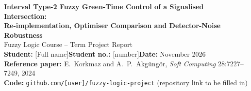 \documentclass[10pt,a4paper]{article}
\begin{document}
\begin{center}
{\LARGE\bfseries Interval Type-2 Fuzzy Green-Time Control of a Signalised Intersection:\\[2pt]
Re-implementation, Optimiser Comparison and Detector-Noise Robustness}\\[8pt]
{\large Fuzzy Logic Course -- Term Project Report}\\[4pt]
\textbf{Student:} [Full name]\quad \textbf{Student no.:} [number]\quad \textbf{Date:} November 2026\\[2pt]
\textbf{Reference paper:} E.~Korkmaz and A.~P.~Akg{\"u}ng{\"o}r, \emph{Soft Computing} 28:7227--7249, 2024 \cite{ref_paper}\\[2pt]
\textbf{Code:} \texttt{github.com/[user]/fuzzy-logic-project} (repository link to be filled in)
\end{center}

\begin{abstract}

\end{abstract}






\end{document}
